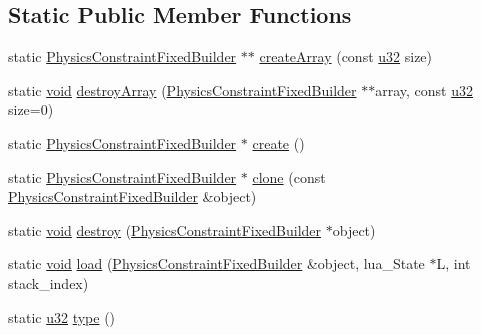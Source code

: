 \subsection*{Static Public Member Functions}
\begin{DoxyCompactItemize}
\item 
static \mbox{\hyperlink{classnjli_1_1_physics_constraint_fixed_builder}{Physics\+Constraint\+Fixed\+Builder}} $\ast$$\ast$ \mbox{\hyperlink{classnjli_1_1_physics_constraint_fixed_builder_acdaeca452058b3f424b916e0c729b7c6}{create\+Array}} (const \mbox{\hyperlink{_util_8h_a10e94b422ef0c20dcdec20d31a1f5049}{u32}} size)
\item 
static \mbox{\hyperlink{_thread_8h_af1e856da2e658414cb2456cb6f7ebc66}{void}} \mbox{\hyperlink{classnjli_1_1_physics_constraint_fixed_builder_a1b4151563bccb912022a8399eb7ec41a}{destroy\+Array}} (\mbox{\hyperlink{classnjli_1_1_physics_constraint_fixed_builder}{Physics\+Constraint\+Fixed\+Builder}} $\ast$$\ast$array, const \mbox{\hyperlink{_util_8h_a10e94b422ef0c20dcdec20d31a1f5049}{u32}} size=0)
\item 
static \mbox{\hyperlink{classnjli_1_1_physics_constraint_fixed_builder}{Physics\+Constraint\+Fixed\+Builder}} $\ast$ \mbox{\hyperlink{classnjli_1_1_physics_constraint_fixed_builder_a279c0c26b9faad323068b428724bf091}{create}} ()
\item 
static \mbox{\hyperlink{classnjli_1_1_physics_constraint_fixed_builder}{Physics\+Constraint\+Fixed\+Builder}} $\ast$ \mbox{\hyperlink{classnjli_1_1_physics_constraint_fixed_builder_af4326c3a53c9a8fce71472d6d4815a47}{clone}} (const \mbox{\hyperlink{classnjli_1_1_physics_constraint_fixed_builder}{Physics\+Constraint\+Fixed\+Builder}} \&object)
\item 
static \mbox{\hyperlink{_thread_8h_af1e856da2e658414cb2456cb6f7ebc66}{void}} \mbox{\hyperlink{classnjli_1_1_physics_constraint_fixed_builder_a87f26beab39b90667c2993d411c0657f}{destroy}} (\mbox{\hyperlink{classnjli_1_1_physics_constraint_fixed_builder}{Physics\+Constraint\+Fixed\+Builder}} $\ast$object)
\item 
static \mbox{\hyperlink{_thread_8h_af1e856da2e658414cb2456cb6f7ebc66}{void}} \mbox{\hyperlink{classnjli_1_1_physics_constraint_fixed_builder_ad9c96e7a0630f5216dbe5ba7bc5a1131}{load}} (\mbox{\hyperlink{classnjli_1_1_physics_constraint_fixed_builder}{Physics\+Constraint\+Fixed\+Builder}} \&object, lua\+\_\+\+State $\ast$L, int stack\+\_\+index)
\item 
static \mbox{\hyperlink{_util_8h_a10e94b422ef0c20dcdec20d31a1f5049}{u32}} \mbox{\hyperlink{classnjli_1_1_physics_constraint_fixed_builder_a00525afcce888aef5d78deb6b6a9f482}{type}} ()
\end{DoxyCompactItemize}
